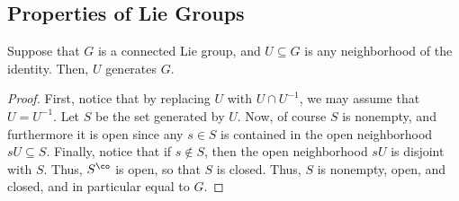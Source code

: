 \documentclass[12pt]{article}
\begin{document}
\subsection{Properties of Lie Groups}

\begin{proposition}\label{prop:Generation_by_Neighborhoods}
    Suppose that $G$ is a connected Lie group, and $U \subseteq G$ is any neighborhood of the identity. Then, $U$ generates $G$. 
\end{proposition}
\begin{proof}
    First, notice that by replacing $U$ with $U \cap U^{-1}$, we may assume that $U = U^{-1}$. Let $S$ be the set generated by $U$. Now, of course $S$ is nonempty, and furthermore it is open since any $s \in S$ is contained in the open neighborhood $sU \subseteq S$. Finally, notice that if $s \not\in S$, then the open neighborhood $sU$ is disjoint with $S$. Thus, $S^{\co}$ is open, so that $S$ is closed. Thus, $S$ is nonempty, open, and closed, and in particular equal to $G$. 
\end{proof}
\end{document}
